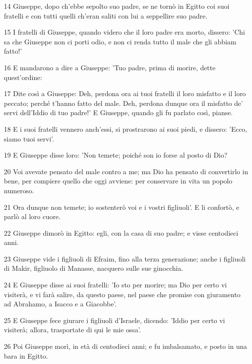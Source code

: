 \par 14 Giuseppe, dopo ch'ebbe sepolto suo padre, se ne tornò in Egitto coi suoi fratelli e con tutti quelli ch'eran saliti con lui a seppellire suo padre.
\par 15 I fratelli di Giuseppe, quando videro che il loro padre era morto, dissero: 'Chi sa che Giuseppe non ci porti odio, e non ci renda tutto il male che gli abbiam fatto!'
\par 16 E mandarono a dire a Giuseppe: 'Tuo padre, prima di morire, dette quest'ordine:
\par 17 Dite così a Giuseppe: Deh, perdona ora ai tuoi fratelli il loro misfatto e il loro peccato; perché t'hanno fatto del male. Deh, perdona dunque ora il misfatto de' servi dell'Iddio di tuo padre!' E Giuseppe, quando gli fu parlato così, pianse.
\par 18 E i suoi fratelli vennero anch'essi, si prostrarono ai suoi piedi, e dissero: 'Ecco, siamo tuoi servi'.
\par 19 E Giuseppe disse loro: 'Non temete; poiché son io forse al posto di Dio?
\par 20 Voi avevate pensato del male contro a me; ma Dio ha pensato di convertirlo in bene, per compiere quello che oggi avviene: per conservare in vita un popolo numeroso.
\par 21 Ora dunque non temete; io sostenterò voi e i vostri figliuoli'. E li confortò, e parlò al loro cuore.
\par 22 Giuseppe dimorò in Egitto: egli, con la casa di suo padre; e visse centodieci anni.
\par 23 Giuseppe vide i figliuoli di Efraim, fino alla terza generazione; anche i figliuoli di Makir, figliuolo di Manasse, nacquero sulle sue ginocchia.
\par 24 E Giuseppe disse ai suoi fratelli: 'Io sto per morire; ma Dio per certo vi visiterà, e vi farà salire, da questo paese, nel paese che promise con giuramento ad Abrahamo, a Isacco e a Giacobbe'.
\par 25 E Giuseppe fece giurare i figliuoli d'Israele, dicendo: 'Iddio per certo vi visiterà; allora, trasportate di qui le mie ossa'.
\par 26 Poi Giuseppe morì, in età di centodieci anni; e fu imbalsamato, e posto in una bara in Egitto.


